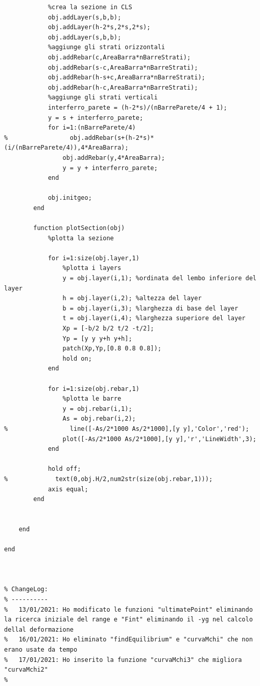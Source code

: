 \documentclass[10pt]{article}
\begin{document}
\begin{lstlisting}
            %crea la sezione in CLS
            obj.addLayer(s,b,b);
            obj.addLayer(h-2*s,2*s,2*s);
            obj.addLayer(s,b,b);
            %aggiunge gli strati orizzontali
            obj.addRebar(c,AreaBarra*nBarreStrati);
            obj.addRebar(s-c,AreaBarra*nBarreStrati);
            obj.addRebar(h-s+c,AreaBarra*nBarreStrati);
            obj.addRebar(h-c,AreaBarra*nBarreStrati);
            %aggiunge gli strati verticali
            interferro_parete = (h-2*s)/(nBarreParete/4 + 1);
            y = s + interferro_parete;
            for i=1:(nBarreParete/4)
%                 obj.addRebar(s+(h-2*s)*(i/(nBarreParete/4)),4*AreaBarra);
                obj.addRebar(y,4*AreaBarra);
                y = y + interferro_parete;
            end
            
            obj.initgeo;
        end
        
        function plotSection(obj)
            %plotta la sezione
            
            for i=1:size(obj.layer,1)
                %plotta i layers
                y = obj.layer(i,1); %ordinata del lembo inferiore del layer
                h = obj.layer(i,2); %altezza del layer
                b = obj.layer(i,3); %larghezza di base del layer
                t = obj.layer(i,4); %larghezza superiore del layer
                Xp = [-b/2 b/2 t/2 -t/2];
                Yp = [y y y+h y+h];
                patch(Xp,Yp,[0.8 0.8 0.8]);
                hold on;
            end
            
            for i=1:size(obj.rebar,1)
                %plotta le barre
                y = obj.rebar(i,1);
                As = obj.rebar(i,2);
%                 line([-As/2*1000 As/2*1000],[y y],'Color','red');
                plot([-As/2*1000 As/2*1000],[y y],'r','LineWidth',3);
            end
			
			hold off;
%             text(0,obj.H/2,num2str(size(obj.rebar,1)));
            axis equal;
        end
        
        
    end
    
end



% ChangeLog:
% ----------
%   13/01/2021: Ho modificato le funzioni "ultimatePoint" eliminando la ricerca iniziale del range e "Fint" eliminando il -yg nel calcolo dellal deformazione
%   16/01/2021: Ho eliminato "findEquilibrium" e "curvaMchi" che non erano usate da tempo
%   17/01/2021: Ho inserito la funzione "curvaMchi3" che migliora "curvaMchi2"
%   
\end{lstlisting}
\end{document}

